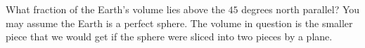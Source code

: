 What fraction of the Earth's volume lies above the $45$ degrees north parallel? You may assume the Earth is a perfect sphere. The volume in question is the smaller piece that we would get if the sphere were sliced into two pieces by a plane.
